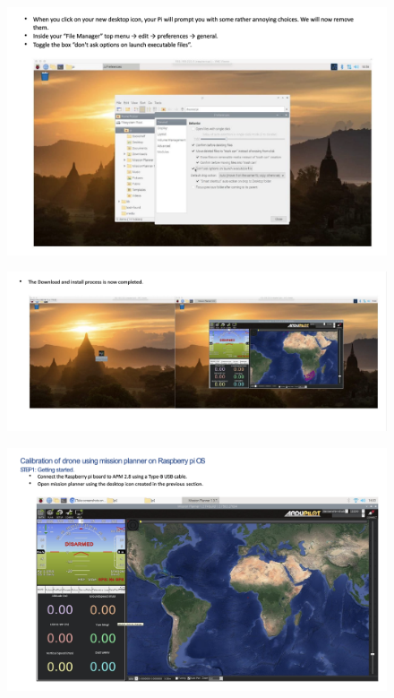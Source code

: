 \begin{figure}[h!]
\centering
\includegraphics[width=\columnwidth]{./Figures/config_img16.png}
\end{figure}

\begin{figure}[h!]
\centering
\includegraphics[width=\columnwidth]{./Figures/config_img17.png}
\end{figure}

\begin{figure}[h!]
\centering
\includegraphics[width=\columnwidth]{./Figures/config_img18.png}
\end{figure}

